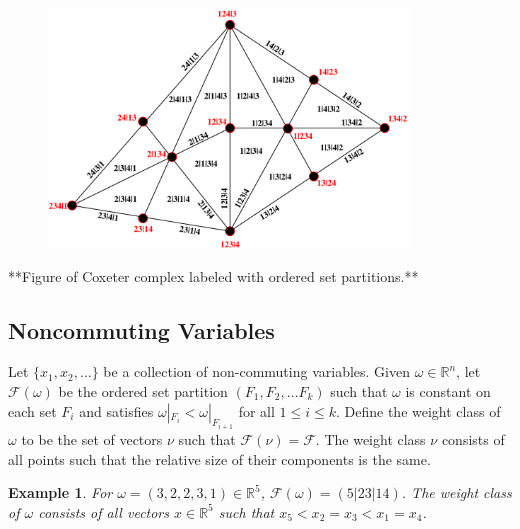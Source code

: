 \documentclass[12pt]{amsart}
\newtheorem{example}[definition]{Example}
\begin{document}
\begin{figure}
\includegraphics[height=2.5in]{Cox.pdf}
\end{figure}


**Figure of Coxeter complex labeled with ordered set partitions.**

\subsection{Noncommuting Variables}




Let $\{x_1, x_2, \ldots \}$ be a collection of non-commuting
variables.  Given $\omega\in \mathbb{R}^n$, let $\mathcal{F}(\omega)$
be the ordered set partition $(F_1,F_2, \ldots F_k)$ such that 
$\omega$ is constant on each set $F_i$
and satisfies $\omega|_{F_i} < \omega|_{F_{i+1}}$ for all $1 \leq i \leq k$. 
Define the weight class of $\omega$ to be the set of vectors $\nu$
such that $\mathcal{F}(\nu) = \mathcal{F}$.  The weight class $\nu$ consists of all 
points such that the relative size of their components is the same.

\begin{example}
For $\omega = (3,2,2,3,1) \in \mathbb{R}^5$, $\mathcal{F}(\omega) =
(5|23|14)$.  The weight class of $\omega$ consists of all vectors $x
\in \mathbb{R}^5$ such that $x_5 < x_2 = x_3 < x_1 = x_4$. 
\end{example}
\end{document}
